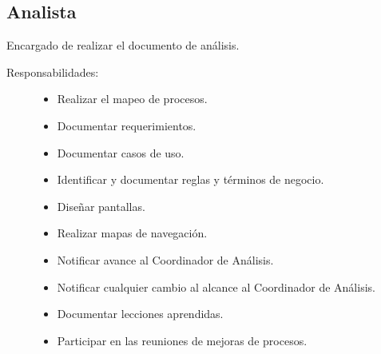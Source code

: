 \subsection{Analista}
	Encargado de realizar el documento de análisis.
\begin{description}
	\item[Responsabilidades:] \cdtEmpty 	
    \begin{itemize}
    	\item Realizar el mapeo de procesos.
    	\item Documentar requerimientos.
    	\item Documentar casos de uso.
    	\item Identificar y documentar reglas y términos de negocio.
    	\item Diseñar pantallas.
    	\item Realizar mapas de navegación.
    	\item Notificar avance al Coordinador de Análisis.
    	\item Notificar cualquier cambio al alcance al Coordinador de Análisis.
    	\item Documentar lecciones aprendidas.
    	\item Participar en las reuniones de mejoras de procesos.
    \end{itemize}
\end{description}

